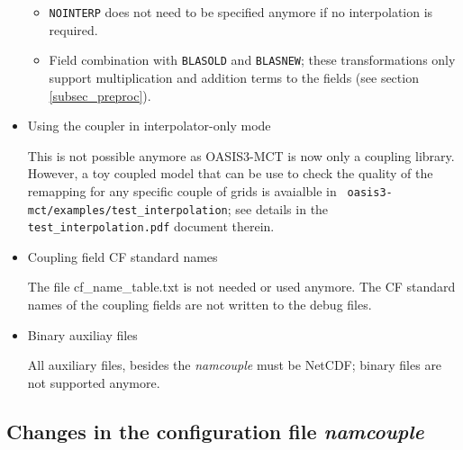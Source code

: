 \begin{itemize}
\begin{itemize}
\item{\tt NOINTERP} does not need to be specified anymore if no
  interpolation is required.
 
\item Field combination with {\tt BLASOLD} and {\tt BLASNEW}; these
  transformations only support multiplication and addition terms to
the fields (see section \ref{subsec_preproc}). 

\end{itemize}

\item Using the coupler in interpolator-only mode

This is not possible anymore as OASIS3-MCT is now only a coupling
library. However, a
toy coupled model that can be use to check the quality of the
remapping for any specific couple of grids is avaialble in {\tt
  oasis3-mct/examples/test\_interpolation}; see details in the {\tt
  test\_interpolation.pdf} document therein.

\item Coupling field CF standard names

The file cf\_name\_table.txt is not needed or used anymore. The CF
  standard names of the coupling fields are not written to the debug
  files.

\item Binary auxiliay files

All auxiliary files, besides the {\it namcouple} must be NetCDF;
  binary files are not supported anymore.
\end{itemize}

\subsection{Changes in the configuration file {\it namcouple}}
\label{sec_changes_namcouple}

